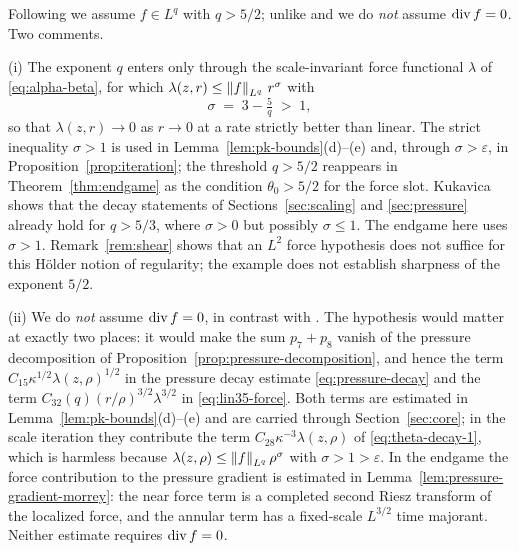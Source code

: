 \documentclass[11pt,reqno]{amsart}
\begin{document}
\begin{remark}\label{rem:force}
Following \cite{CKN1982} we assume $f\in L^{q}$ with $q>5/2$; unlike
\cite{Kukavica2008} and \cite[Definition 13.4]{LemarieRieusset2016} we do
\emph{not} assume $\operatorname{div} f=0$. Two comments.

(i) The exponent $q$ enters only through the scale-invariant force functional
$\lambda$ of \eqref{eq:alpha-beta}, for which
$\lambda(z,r)\le\left\lVert f \right\rVert_{L^{q}}\,r^{\sigma}$ with
\begin{equation}\label{eq:sigma}
  \sigma\;=\;3-\tfrac5q\;>\;1 ,
\end{equation}
so that $\lambda(z,r)\to0$ as $r\to0$ at a rate strictly better than linear.
The strict inequality $\sigma>1$ is used in Lemma~\ref{lem:pk-bounds}(d)--(e)
and, through $\sigma>\varepsilon$, in Proposition~\ref{prop:iteration}; the
threshold $q>5/2$ reappears in Theorem~\ref{thm:endgame} as the condition
$\theta_{0}>5/2$ for the force slot.
Kukavica \cite[Theorem 2]{Kukavica2008} shows that the decay statements of
Sections~\ref{sec:scaling} and \ref{sec:pressure} already hold for $q>5/3$,
where $\sigma>0$ but possibly $\sigma\le1$. The endgame here uses
$\sigma>1$. Remark~\ref{rem:shear} shows that an $L^{2}$ force hypothesis
does not suffice for this H\"older notion of regularity; the example does
not establish sharpness of the exponent $5/2$.
%
%

(ii) We do \emph{not} assume $\operatorname{div} f=0$, in contrast with
\cite{Kukavica2008}. The hypothesis would matter at exactly two places: it would
make the sum $p_{7}+p_{8}$ vanish of the pressure decomposition of
Proposition~\ref{prop:pressure-decomposition}, and hence the term
$C_{15}\kappa^{1/2}\lambda(z,\rho)^{1/2}$ in the pressure decay estimate
\eqref{eq:pressure-decay} and the term
$C_{32}(q)(r/\rho)^{3/2}\lambda^{3/2}$ in \eqref{eq:lin35-force}. Both terms are estimated in
Lemma~\ref{lem:pk-bounds}(d)--(e) and are carried through
Section~\ref{sec:core}; in the scale iteration they contribute the term
$C_{28}\kappa^{-3}\lambda(z,\rho)$ of \eqref{eq:theta-decay-1}, which is
harmless because $\lambda(z,\rho)\le\left\lVert f \right\rVert_{L^{q}}\rho^{\sigma}$ with
$\sigma>1>\varepsilon$. In the endgame the force contribution to the pressure gradient is
estimated in Lemma~\ref{lem:pressure-gradient-morrey}: the near force
term is a completed second Riesz transform of the localized force, and
the annular term has a fixed-scale $L^{3/2}$ time majorant. Neither
estimate requires $\operatorname{div} f=0$.
\end{remark}
\end{document}
